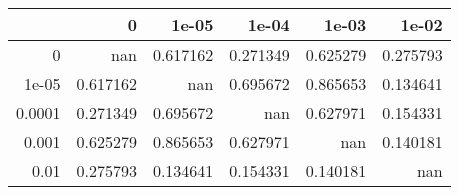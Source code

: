 \begin{tabular}{rrrrrr}
\toprule
        &          0 &      1e-05 &      1e-04 &      1e-03 &      1e-02 \\
\midrule
 0      & nan        &   0.617162 &   0.271349 &   0.625279 &   0.275793 \\
 1e-05  &   0.617162 & nan        &   0.695672 &   0.865653 &   0.134641 \\
 0.0001 &   0.271349 &   0.695672 & nan        &   0.627971 &   0.154331 \\
 0.001  &   0.625279 &   0.865653 &   0.627971 & nan        &   0.140181 \\
 0.01   &   0.275793 &   0.134641 &   0.154331 &   0.140181 & nan        \\
\bottomrule
\end{tabular}